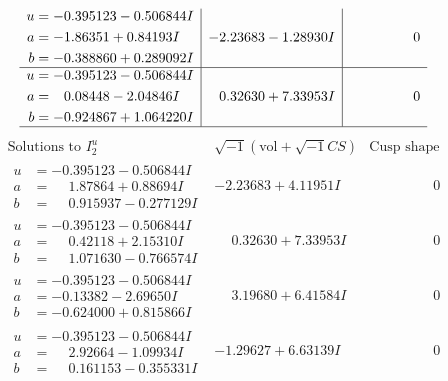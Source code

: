 \documentclass[1p]{elsarticle_modified}
\theoremstyle{definition}
\newcommand{\I}{\sqrt{-1}}
\begin{document}
$$\begin{array}{c|c|c}
\begin{aligned}
u &= -0.395123 - 0.506844 I \\
a &= -1.86351 + 0.84193 I \\
b &= -0.388860 + 0.289092 I\end{aligned}
 & -2.23683 - 1.28930 I & \phantom{-0.000000 } 0 \\ \hline\begin{aligned}
u &= -0.395123 - 0.506844 I \\
a &= \phantom{-}0.08448 - 2.04846 I \\
b &= -0.924867 + 1.064220 I\end{aligned}
 & \phantom{-}0.32630 + 7.33953 I & \phantom{-0.000000 } 0\\
 \hline 
 \end{array}$$\newpage$$\begin{array}{c|c|c}  
\text{Solutions to }I^u_{2}& \I (\text{vol} + \sqrt{-1}CS) & \text{Cusp shape}\\
 \hline 
\begin{aligned}
u &= -0.395123 - 0.506844 I \\
a &= \phantom{-}1.87864 + 0.88694 I \\
b &= \phantom{-}0.915937 - 0.277129 I\end{aligned}
 & -2.23683 + 4.11951 I & \phantom{-0.000000 } 0 \\ \hline\begin{aligned}
u &= -0.395123 - 0.506844 I \\
a &= \phantom{-}0.42118 + 2.15310 I \\
b &= \phantom{-}1.071630 - 0.766574 I\end{aligned}
 & \phantom{-}0.32630 + 7.33953 I & \phantom{-0.000000 } 0 \\ \hline\begin{aligned}
u &= -0.395123 - 0.506844 I \\
a &= -0.13382 - 2.69650 I \\
b &= -0.624000 + 0.815866 I\end{aligned}
 & \phantom{-}3.19680 + 6.41584 I & \phantom{-0.000000 } 0 \\ \hline\begin{aligned}
u &= -0.395123 - 0.506844 I \\
a &= \phantom{-}2.92664 - 1.09934 I \\
b &= \phantom{-}0.161153 - 0.355331 I\end{aligned}
 & -1.29627 + 6.63139 I & \phantom{-0.000000 } 0 \\ \hline\begin{aligned}

\end{aligned}
\end{array}$$
\end{document}
